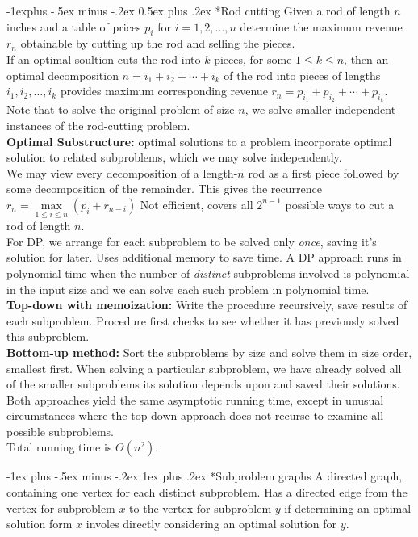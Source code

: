 \documentclass[10pt,landscape]{article}
\makeatletter
\renewcommand{\subsection}{\@startsection{subsection}{2}{0mm}%
                                {-1explus -.5ex minus -.2ex}%
                                {0.5ex plus .2ex}%
                                {\normalfont\normalsize\bfseries}}
\renewcommand{\subsubsection}{\@startsection{subsubsection}{3}{0mm}%
                                {-1ex plus -.5ex minus -.2ex}%
                                {1ex plus .2ex}%
                                {\normalfont\small\bfseries}}
\makeatother
\begin{document}
\begin{multicols}{3}
\subsection*{Rod cutting}
\scriptsize{
Given a rod of length $n$ inches and a table of prices $p_i$ for $i = 1,
2,\ldots,n$ determine the maximum revenue $r_n$ obtainable by cutting up the rod
and selling the pieces.\\
If an optimal soultion cuts the rod into $k$ pieces, for some $1 \leq k \leq n$,
then an optimal decomposition $n = i_1 + i_2 + \cdots + i_k$ of the rod into
pieces of lengths $i_1,i_2,\ldots,i_k$ provides maximum corresponding revenue
$r_n=p_{i_1}+p_{i_2}+\cdots+p_{i_k}$.\\
Note that to solve the original problem of size $n$, we solve smaller
independent instances of the rod-cutting problem. \\
\textbf{Optimal Substructure:} optimal solutions to a problem incorporate
optimal solution to related subproblems, which we may solve independently.\\
We may view every decomposition of a length-$n$ rod as a first piece followed by some decomposition of the remainder. This gives the recurrence $r_n = \underset{1\leq i \leq n}{\max}(p_i + r_{n-i})$ Not efficient, covers all $2^{n-1}$ possible ways to cut a rod of length $n$.\\
For DP, we arrange for each subproblem to be solved only \emph{once}, saving it's solution for later. Uses additional memory to save time. A DP approach runs in polynomial time when the number of \emph{distinct} subproblems involved is polynomial in the input size and we can solve each such problem in polynomial time.\\
\textbf{Top-down with memoization:} Write the procedure recursively, save results of each subproblem. Procedure first checks to see whether it has previously solved this subproblem.\\
\textbf{Bottom-up method:} Sort the subproblems by size and solve them in size order, smallest first. When solving a particular subproblem, we have already solved all of the smaller subproblems its solution depends upon and saved their solutions.\\
Both approaches yield the same asymptotic running time, except in unusual circumstances where the top-down approach does not recurse to examine all possible subproblems.\\
Total running time is $\Theta(n^2)$.
}

\subsubsection*{Subproblem graphs}
\scriptsize{
A directed graph, containing one vertex for each distinct subproblem. Has a directed edge from the vertex for subproblem $x$ to the vertex for subproblem $y$ if determining an optimal solution form $x$ involes directly considering an optimal solution for $y$.
}


\end{multicols}
\end{document}
